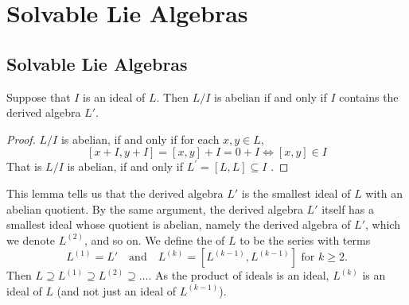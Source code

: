 \documentclass[../main.tex]{subfiles}
\begin{document}
\ifSubfilesClassLoaded{

    \tableofcontents
    
}{}

\chapter{ Solvable Lie Algebras }

\section{Solvable Lie Algebras}

\begin{lemma}{}{}
Suppose that $I$ is an ideal of $L$. Then $L/I$ is abelian if and only if $I$ contains the derived algebra $L'$.
\end{lemma}

\begin{proof}
     \(  L/I  \) is abelian, if and only if for each \(  x,y \in L  \), \[
    \left[ x+ I,y+ I \right]= \left[ x,y \right]+ I= 0+ I\iff  \left[ x,y \right]\in I   
    \] That is \(  L/I  \) is abelian, if and only if \(  L^{\prime} = \left[ L,L \right]\subseteq I   \)  .
\end{proof}

\begin{definition}{}{}
    This lemma tells us that the derived algebra $L'$ is the smallest ideal of $L$ with an abelian quotient. By the same argument, the derived algebra $L'$ itself has a smallest ideal whose quotient is abelian, namely the derived algebra of $L'$, which we denote $L^{(2)}$, and so on. We define the  of $L$ to be the series with terms
\[
L^{(1)} = L' \quad \text{and} \quad L^{(k)} = [L^{(k-1)}, L^{(k-1)}] \text{ for } k \ge 2.
\]
Then $L \supseteq L^{(1)} \supseteq L^{(2)} \supseteq \dots$.
As the product of ideals is an ideal, $L^{(k)}$ is an ideal of $L$ (and not just an ideal of $L^{(k-1)}$).
\end{definition}
\end{document}
